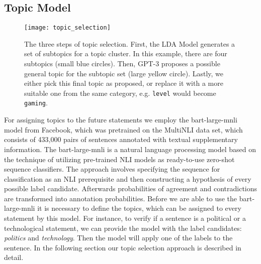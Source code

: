 \subsection{Topic Model}
\label{topic-model}
\begin{figure}[t]
    \centering
    \texttt{[image: topic\_selection]}
    \caption{
        The three steps of topic selection.
        First, the LDA Model generates a set of subtopics for a topic cluster.
        In this example, there are four subtopics (small blue circles).
        Then, GPT-3 proposes a possible general topic for the subtopic set (large yellow circle).
        Lastly, we either pick this final topic as proposed, or replace it with a more suitable one from the same category, e.g. \texttt{level} would become \texttt{gaming}.
    }
    \label{fig:topic_selection}
\end{figure}
For assigning topics to the future statements we employ the bart-large-mnli model from Facebook, which was pretrained on the MultiNLI \citep{N18-1101} data set, which consists of 433,000 pairs of sentences annotated with textual supplementary information. The bart-large-mnli is a natural language processing model based on the technique of \citet{yin2019benchmarking} utilizing pre-trained NLI models as ready-to-use zero-shot sequence classifiers.
The approach involves specifying the sequence for classification as an NLI prerequisite and then constructing a hypothesis of every possible label candidate.
Afterwards probabilities of agreement and contradictions are transformed into annotation probabilities.
Before we are able to use the bart-large-mnli it is necessary to define the topics, which can be assigned to every statement by this model.
For instance, to verify if a sentence is a political or a technological statement, we can provide the model with the label candidates: \emph{politics} and \emph{technology}. Then the model will apply one of the labels to the sentence.
In the following section our topic selection approach is described in detail.

